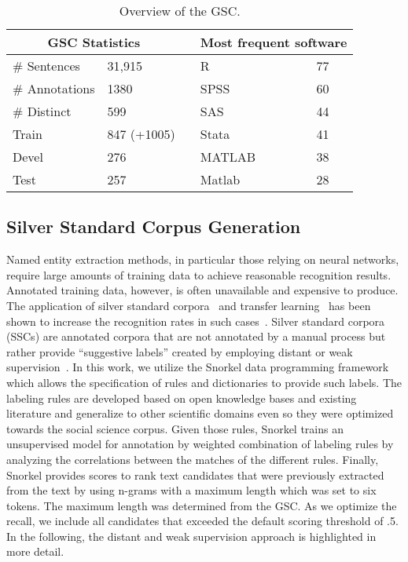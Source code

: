 \documentclass[runningheads]{llncs}
\begin{document}
\begin{table}[tb]
    \centering
    \caption{Overview of the GSC.}
    \label{tab:gsc}
    \begin{tabularx}{.8\textwidth}{Xp{2cm}p{2cm}Xp{1cm}}
    \toprule
    \multicolumn{2}{c}{GSC Statistics} & &\multicolumn{2}{c}{Most frequent software}\\
    \midrule
    \# Sentences & 31,915 & &R & 77\\
    \# Annotations & 1380 & &SPSS & 60\\
    \# Distinct & 599 & &SAS & 44\\
    Train & 847 (+1005) & &Stata & 41\\
    Devel & 276 & &MATLAB & 38 \\
    Test & 257 & &Matlab & 28 \\ 
    \bottomrule
  \end{tabularx}  
\end{table}

\subsection{Silver Standard Corpus Generation}
Named entity extraction methods, in particular those relying on neural networks, require large amounts of training data to achieve reasonable recognition results.
Annotated training data, however, is often unavailable and expensive to produce.
The application of silver standard corpora~\cite{REBHOLZ-SCHUHMANN2010} and transfer learning~\cite{ruder2019neural} has been shown to increase the recognition rates in such cases~\cite{Giorgi2018}.
Silver standard corpora (SSCs) are annotated corpora that are not annotated by a manual process but rather provide ``suggestive labels'' created by employing distant or weak supervision~\cite{Boland2019}.
In this work, we utilize the Snorkel data programming framework~\cite{ratner2017snorkel} which allows the specification of rules and dictionaries to provide such labels.
The labeling rules are developed based on open knowledge bases and existing literature and generalize to other scientific domains even so they were optimized towards the social science corpus.  
Given those rules, Snorkel trains an unsupervised model for annotation by weighted combination of labeling rules by analyzing the correlations between the matches of the different rules.
Finally, Snorkel provides scores to rank text candidates that were previously extracted from the text by using n-grams with a maximum length which was set to six tokens.
The maximum length was determined from the GSC.
As we optimize the recall, we include all candidates that exceeded the default scoring threshold of .5.
In the following, the distant and weak supervision approach is highlighted in more detail.
\end{document}
